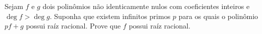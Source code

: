 Sejam $f$ e $g$ dois polinômios não identicamente nulos com coeficientes inteiros e $\deg f>\deg g$.
Suponha que existem infinitos primos $p$ para os quais o polinômio $pf+g$ possui raíz racional.
Prove que $f$ possui raíz racional.
